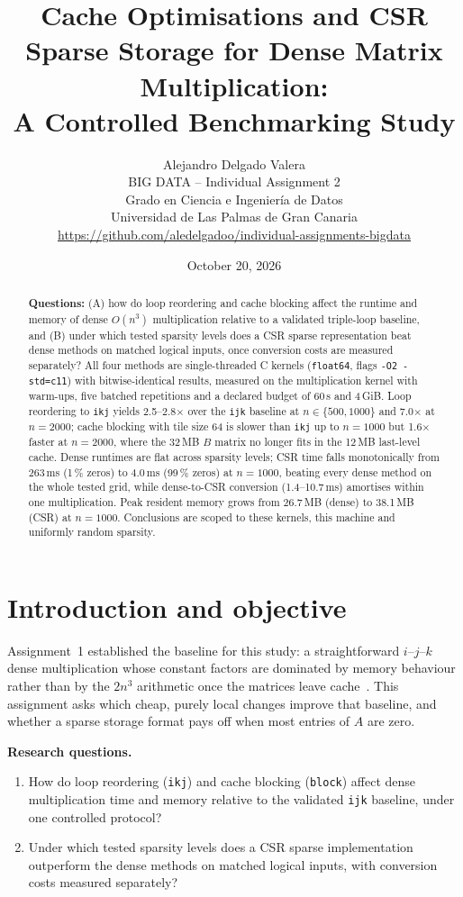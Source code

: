 \documentclass[11pt,a4paper]{article}
\title{\textbf{Cache Optimisations and CSR Sparse Storage for Dense Matrix
Multiplication:\\ A Controlled Benchmarking Study}}
\author{Alejandro Delgado Valera\\
\small BIG DATA -- Individual Assignment 2\\
\small Grado en Ciencia e Ingenier{\'i}a de Datos\\
\small Universidad de Las Palmas de Gran Canaria\\
\small \url{https://github.com/aledelgadoo/individual-assignments-bigdata}}
\date{October 20, 2026}
\begin{document}
\maketitle

\begin{abstract}
\noindent\textbf{Questions:} (A) how do loop reordering and cache blocking affect
the runtime and memory of dense $O(n^3)$ multiplication relative to a validated
triple-loop baseline, and (B) under which tested sparsity levels does a CSR sparse
representation beat dense methods on matched logical inputs, once conversion costs
are measured separately? All four methods are single-threaded C kernels
(\texttt{float64}, flags \texttt{-O2 -std=c11}) with bitwise-identical results,
measured on the multiplication kernel with warm-ups, five batched repetitions and a
declared budget of 60\,s and 4\,GiB. Loop reordering to \texttt{ikj} yields
2.5--2.8$\times$ over the \texttt{ijk} baseline at $n \in \{500,1000\}$ and
7.0$\times$ at $n=2000$; cache blocking with tile size 64 is slower than
\texttt{ikj} up to $n=1000$ but 1.6$\times$ faster at $n=2000$, where the
32\,MB $B$ matrix no longer fits in the 12\,MB last-level cache. Dense runtimes are
flat across sparsity levels; CSR time falls monotonically from 263\,ms (1\,\% zeros)
to 4.0\,ms (99\,\% zeros) at $n=1000$, beating every dense method on the whole
tested grid, while dense-to-CSR conversion (1.4--10.7\,ms) amortises within one
multiplication. Peak resident memory grows from 26.7\,MB (dense) to 38.1\,MB (CSR)
at $n=1000$. Conclusions are scoped to these kernels, this machine and uniformly
random sparsity.
\end{abstract}

\section{Introduction and objective}

Assignment~1 established the baseline for this study: a straightforward
$i$--$j$--$k$ dense multiplication whose constant factors are dominated by memory
behaviour rather than by the $2n^3$ arithmetic once the matrices leave
cache~\cite{strang2016,cormen2022}. This assignment asks which cheap, purely local
changes improve that baseline, and whether a sparse storage format pays off when
most entries of $A$ are zero.

\textbf{Research questions.}
\begin{enumerate}
  \item[A:] How do loop reordering (\texttt{ikj}) and cache blocking (\texttt{block})
        affect dense multiplication time and memory relative to the validated
        \texttt{ijk} baseline, under one controlled protocol?
  \item[B:] Under which tested sparsity levels does a CSR sparse implementation
        outperform the dense methods on matched logical inputs, with conversion
        costs measured separately?
\end{enumerate}
\end{document}
